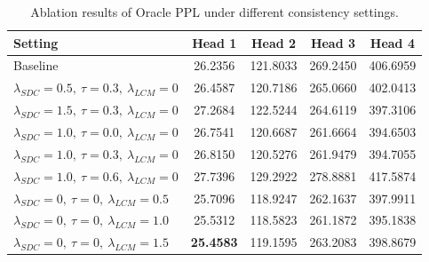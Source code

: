 \begin{table}[!htbp]
    \centering
    \caption{Ablation results of Oracle PPL under different consistency settings.}
    \label{tab:ablation_oracle_ppl}
    \small
    \begin{tabular}{lcccc}
        \toprule[1.25pt]
        Setting
        & Head 1
        & Head 2
        & Head 3
        & Head 4 \\
        \midrule

        Baseline
        & 26.2356 
        & 121.8033 
        & 269.2450 
        & 406.6959  \\

        $\lambda_{SDC}=0.5,\ \tau=0.3,\ \lambda_{LCM}=0$
        & 26.4587 
        & 120.7186 
        & 265.0660 
        & 402.0413  \\
        
        $\lambda_{SDC}=1.5,\ \tau=0.3,\ \lambda_{LCM}=0$
        & 27.2684 
        & 122.5244 
        & 264.6119 
        & 397.3106  \\

        \midrule

        $\lambda_{SDC}=1.0,\ \tau=0.0,\ \lambda_{LCM}=0$
        & 26.7541 
        & 120.6687 
        & 261.6664 
        & 394.6503  \\

        $\lambda_{SDC}=1.0,\ \tau=0.3,\ \lambda_{LCM}=0$
        & 26.8150 
        & 120.5276 
        & 261.9479 
        & 394.7055  \\

        $\lambda_{SDC}=1.0,\ \tau=0.6,\ \lambda_{LCM}=0$
        & 27.7396 
        & 129.2922
        & 278.8881 
        & 417.5874  \\

        \midrule

        $\lambda_{SDC}=0,\ \tau=0,\ \lambda_{LCM}=0.5$
        & 25.7096 
        & 118.9247 
        & 262.1637 
        & 397.9911  \\

        $\lambda_{SDC}=0,\ \tau=0,\ \lambda_{LCM}=1.0$
        & 25.5312 
        & 118.5823 
        & 261.1872 
        & 395.1838  \\

        $\lambda_{SDC}=0,\ \tau=0,\ \lambda_{LCM}=1.5$
        & \textbf{25.4583} 
        & 119.1595 
        & 263.2083 
        & 398.8679  \\

        \midrule


\end{tabular}
\end{table}
